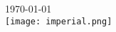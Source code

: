 \begin{titlepage}
	
	
	{\large \today}\\[2.5cm] %
	
	
	\texttt{[image: imperial.png]}\\[1cm]
	\vfill %
\end{titlepage}